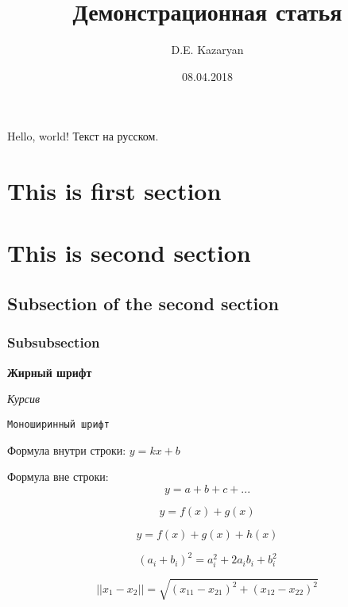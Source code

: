 \documentclass[a4paper,12pt]{article}
\title{Демонстрационная статья}
\date{08.04.2018}
\author{D.E. Kazaryan}
\begin{document}
\maketitle


Hello, world! Текст на русском.

\section{This is first section}

\section{This is second section}

\subsection{Subsection of the second section}

\subsubsection{Subsubsection}

\textbf{Жирный шрифт}

\textit{Курсив}

\texttt{Моноширинный шрифт}

Формула внутри строки: $y=kx+b$

Формула вне строки: $$y=a+b+c+...$$

\begin{equation}
    y = f(x) + g(x)
\end{equation}

\begin{equation*}
    y = f(x) + g(x) + h(x)
\end{equation*}

\begin{equation}
    (a_i+b_i)^2 = a_i^2 + 2 a_i b_i + b_i^2
\end{equation}

\begin{equation}
    ||x_1 - x_2|| = \sqrt{(x_{11} - x_{21})^2 + (x_{12} - x_{22})^2}
\end{equation}
\end{document}
